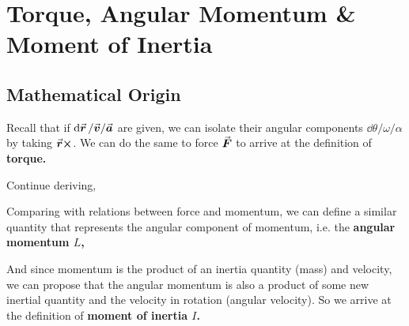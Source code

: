 \documentclass[class=article, crop=false, 12pt]{standalone}
\begin{document}
\linesep
\section{Torque, Angular Momentum \& Moment of Inertia}

\subsection{Mathematical Origin}

Recall that if $\dd{\va*{r}}/\va*{v}/\va*{a}$ are given, 
we can isolate their angular components $\dd{\theta}/\omega/\alpha$ by taking $\va*{r}\cross$. 
We can do the same to force $\va*{F}$
to arrive at the definition of \bf{torque}.

Continue deriving,

Comparing with relations between force and momentum, we can define a similar quantity that represents the angular component of momentum,
i.e. the \bf{angular momentum} $L$,

And since momentum is the product of an inertia quantity (mass) and velocity, 
we can propose that the angular momentum is also a product of some new inertial quantity and the velocity in rotation (angular velocity).
So we arrive at the definition of \bf{moment of inertia} $I$.
\end{document}
